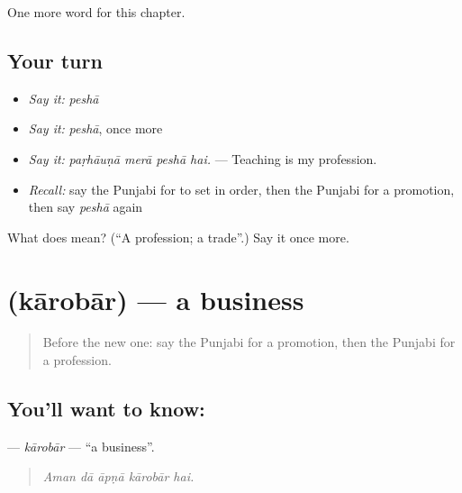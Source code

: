 \begin{grammarlens}[title={What you've built}]
One more word for this chapter.
\end{grammarlens}

\subsection*{Your turn}
\begin{itemize}
\raggedright
  \item \emph{Say it:} \emph{peshā}
  \item \emph{Say it:} \emph{peshā}, once more
  \item \emph{Say it:} \emph{paṛhāuṇā merā peshā hai.} — Teaching is my profession.
  \item \emph{Recall:} say the Punjabi for to set in order, then the Punjabi for a promotion, then say \emph{peshā} again
\end{itemize}

\begin{tcolorbox}[breakable,colback=teal!4,colframe=teal!35!black,title={Before you move on}]
What does  mean? (\textquotedblleft{}A profession; a trade\textquotedblright{}.) Say it once more.
\end{tcolorbox}
\section[\texorpdfstring{\pa{ਕਾਰੋਬਾਰ} (kārobār)}{ਕਾਰੋਬਾਰ (kārobār)}]{ (kārobār) — a business}

\label{lesson:PA-C364-karobar}



\begin{quote}
Before the new one: say the Punjabi for a promotion, then the Punjabi for a profession.
\end{quote}

\subsection*{You'll want to know: }
\textbf{} — \emph{kārobār} — \textquotedblleft{}a business\textquotedblright{}.

\begin{quote}
    
\end{quote}

\begin{quote}
\emph{Aman dā āpṇā kārobār hai.}
\end{quote}

